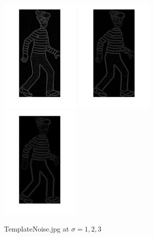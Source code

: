 \documentclass[11pt]{article}
\begin{document}
\begin{figure}[h]
  \caption{TemplateNoise.jpg at $\sigma = 1, 2, 3$ }
    \includegraphics[width=0.34\textwidth]{templateNoiseSigma1}
    \includegraphics[width=0.34\textwidth]{templateNoiseSigma2}
    \includegraphics[width=0.34\textwidth]{templateNoiseSigma3}
\end{figure}
\end{document}
